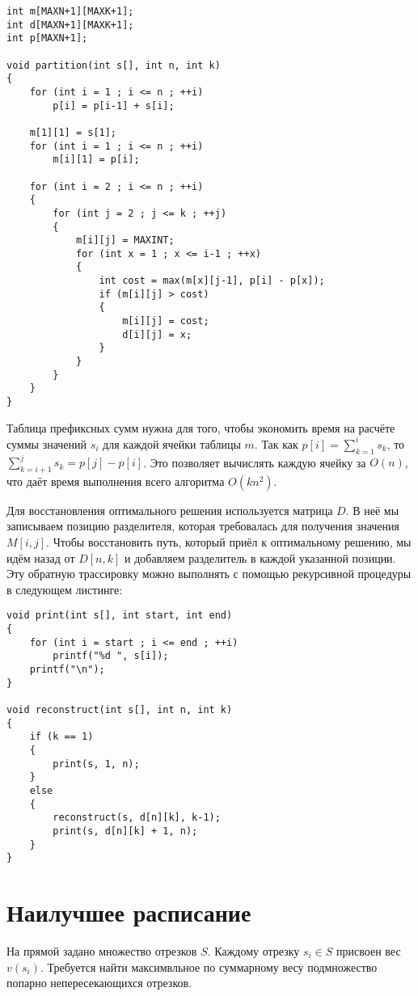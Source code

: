 \documentclass[14pt,openany]{book}
\begin{document}
\begin{lstlisting}
int m[MAXN+1][MAXK+1];
int d[MAXN+1][MAXK+1];
int p[MAXN+1];

void partition(int s[], int n, int k)
{
    for (int i = 1 ; i <= n ; ++i)
        p[i] = p[i-1] + s[i];

    m[1][1] = s[1];
    for (int i = 1 ; i <= n ; ++i)
        m[i][1] = p[i];

    for (int i = 2 ; i <= n ; ++i)
    {
        for (int j = 2 ; j <= k ; ++j)
        {
            m[i][j] = MAXINT;
            for (int x = 1 ; x <= i-1 ; ++x)
            {
                int cost = max(m[x][j-1], p[i] - p[x]);
                if (m[i][j] > cost)
                {
                    m[i][j] = cost;
                    d[i][j] = x;
                }
            }
        }
    }
}
\end{lstlisting}

Таблица префиксных сумм нужна для того, чтобы экономить время на расчёте суммы
значений $s_i$ для каждой ячейки таблицы $m$. Так как $p[i] = \sum_{k=1}^{i}s_k$,
то $\sum_{k=i+1}^{j}s_k = p[j] - p[i]$. Это позволяет вычислять каждую ячейку за
$O(n)$, что даёт время выполнения всего алгоритма $O(kn^2)$.

Для восстановления оптимального решения используется матрица $D$. В неё мы записываем
позицию разделителя, которая требовалась для получения значения $M[i,j]$. Чтобы
восстановить путь, который приёл к оптимальному решению, мы идём назад от $D[n,k]$
и добавляем разделитель в каждой указанной позиции. Эту обратную трассировку можно
выполнять с помощью рекурсивной процедуры в следующем листинге:

\begin{lstlisting}
void print(int s[], int start, int end)
{
    for (int i = start ; i <= end ; ++i)
        printf("%d ", s[i]);
    printf("\n");
}

void reconstruct(int s[], int n, int k)
{
    if (k == 1)
    {
        print(s, 1, n);
    }
    else
    {
        reconstruct(s, d[n][k], k-1);
        print(s, d[n][k] + 1, n);
    }
}
\end{lstlisting}


\section{Наилучшее расписание}

На прямой задано множество отрезков $S$. Каждому отрезку $s_i \in S$ присвоен вес $v(s_i)$.
Требуется найти максимвльное по суммарному весу подмножество попарно непересекающихся отрезков.
\end{document}
